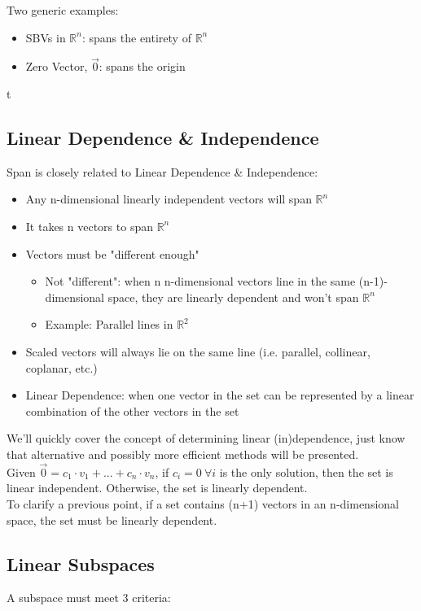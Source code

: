 Two generic examples:
\begin{itemize}
	\item SBVs in $\mathbb{R}^n$: spans the entirety of $\mathbb{R}^n$
	\item Zero Vector, $\vec{0}$: spans the origin
\end{itemize}t 

\subsection{Linear Dependence \& Independence}\label{concept1.7}
Span is closely related to Linear Dependence \& Independence:

\begin{itemize}
	\item Any n-dimensional linearly independent vectors will span $\mathbb{R}^n$
	\item It takes n vectors to span $\mathbb{R}^n$
	\item Vectors must be "different enough"
	\begin{itemize}
		\item Not "different": when n n-dimensional vectors line in the same (n-1)-dimensional space, they are linearly dependent and won't span $\mathbb{R}^n$
		\item Example: Parallel lines in $\mathbb{R}^2$
	\end{itemize}
	\item Scaled vectors will always lie on the same line (i.e. parallel, collinear, coplanar, etc.)
	\item Linear Dependence: when one vector in the set can be represented by a linear combination of the other vectors in the set
\end{itemize}

We'll quickly cover the concept of determining linear (in)dependence, just know that alternative and possibly more efficient methods will be presented.
\\

Given $\vec{0} = c_1 \cdot v_1 + . . . + c_n \cdot v_n$, if $c_i = 0 \: \forall i $ is the only solution, then the set is linear independent. Otherwise, the set is linearly dependent.
\\

To clarify a previous point, if a set contains (n+1) vectors in an n-dimensional space, the set must be linearly dependent.

\subsection{Linear Subspaces}\label{concept1.8}
A subspace must meet 3 criteria:


